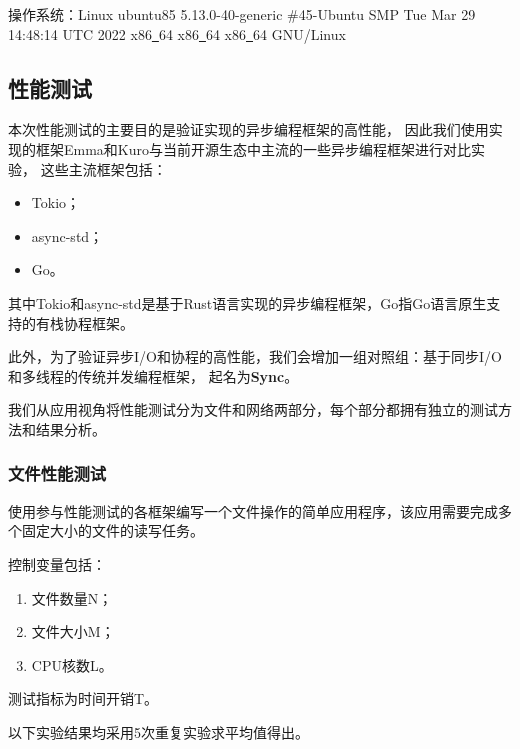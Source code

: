 \documentclass[supercite]{HustGraduPaper}
\theoremstyle{definition}
\begin{document}
操作系统：Linux ubuntu85 5.13.0-40-generic \#45-Ubuntu SMP Tue Mar 29 14:48:14 UTC 2022 x86\underline{~}64 x86\underline{~}64 x86\underline{~}64 GNU/Linux\par

\subsection{性能测试}

本次性能测试的主要目的是验证实现的异步编程框架的高性能，
因此我们使用实现的框架Emma和Kuro与当前开源生态中主流的一些异步编程框架进行对比实验，
这些主流框架包括：

\begin{itemize}
  \item Tokio；
  \item async-std；
  \item Go。
\end{itemize}

其中Tokio和async-std是基于Rust语言实现的异步编程框架，Go指Go语言原生支持的有栈协程框架。\par

此外，为了验证异步I/O和协程的高性能，我们会增加一组对照组：基于同步I/O和多线程的传统并发编程框架，
起名为\textbf{Sync}。\par

我们从应用视角将性能测试分为文件和网络两部分，每个部分都拥有独立的测试方法和结果分析。\par

\subsubsection{文件性能测试}


使用参与性能测试的各框架编写一个文件操作的简单应用程序，该应用需要完成多个固定大小的文件的读写任务。\par

控制变量包括：

\begin{enumerate}
  \item 文件数量N；
  \item 文件大小M；
  \item CPU核数L。
\end{enumerate}

测试指标为时间开销T。\par

以下实验结果均采用5次重复实验求平均值得出。\par
\end{document}
